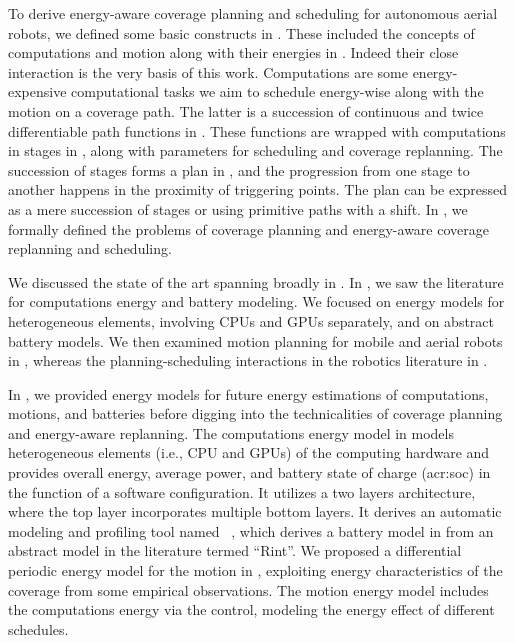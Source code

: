 To derive energy-aware coverage planning and scheduling for autonomous aerial robots, we defined some basic constructs in . These included the concepts of computations and motion along with their energies in . Indeed their close interaction is the very basis of this work. Computations are some energy-expensive computational tasks we aim to schedule energy-wise along with the motion on a coverage path. The latter is a succession of continuous and twice differentiable path functions in . These functions are wrapped with computations in stages in , along with parameters for scheduling and coverage replanning. The succession of stages forms a plan in , and the progression from one stage to another happens in the proximity of triggering points. The plan can be expressed as a mere succession of stages or using primitive paths with a shift. In , we formally defined the problems of coverage planning and energy-aware coverage replanning and scheduling.

We discussed the state of the art spanning broadly in . In , we saw the literature for computations energy and battery modeling. We focused on energy models for heterogeneous elements, involving CPUs and GPUs separately, and on abstract battery models. We then examined motion planning for mobile and aerial robots in , whereas the planning-scheduling interactions in the robotics literature in .

In , we provided energy models for future energy estimations of computations, motions, and batteries before digging into the technicalities of coverage planning and energy-aware replanning. The computations energy model in  models heterogeneous elements (i.e., CPU and GPUs) of the computing hardware and provides overall energy, average power, and battery state of charge (\Gls{acr:soc}) in the function of a software configuration. It utilizes a two layers architecture, where the top layer incorporates multiple bottom layers. It derives an automatic modeling and profiling tool named \powprof~\citep{seewald2019coarse,powprofiler}, which derives a battery model in  from an abstract model in the literature termed ``Rint''. We proposed a differential periodic energy model for the motion in , exploiting energy characteristics of the coverage from some empirical observations. The motion energy model includes the computations energy via the control, modeling the energy effect of different schedules.

